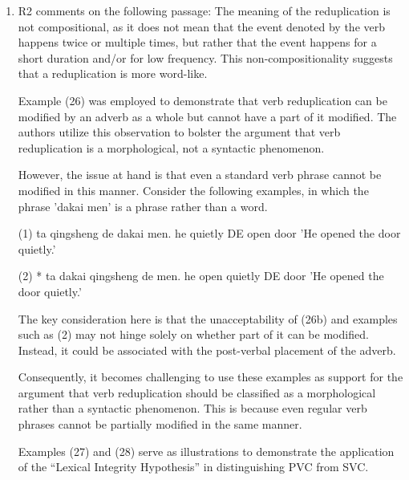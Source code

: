 \documentclass[fleqn,twoside]{article}
\begin{document}
\begin{enumerate}

\item
R2 comments on the following passage: The meaning of the reduplication is not compositional, as it does
not mean that the event denoted by the verb happens twice or multiple times, but
rather that the event happens for a short duration and/or for low frequency. This
non-compositionality suggests that a reduplication is more word-like.



Example (26) was employed to demonstrate that verb reduplication can be modified by an adverb as a whole but cannot have a part of it modified. The authors utilize this observation to bolster the argument that verb reduplication is a morphological, not a syntactic phenomenon.

However, the issue at hand is that even a standard verb phrase cannot be modified in this manner. Consider the following examples, in which the phrase 'dakai men' is a phrase rather than a word.

(1) ta qingsheng de dakai men.
       he  quietly    DE open door
      'He opened the door quietly.'

(2) * ta dakai qingsheng de men.
         he open quietly       DE door
         'He opened the door quietly.'

The key consideration here is that the unacceptability of (26b) and examples such as (2) may not hinge solely on whether part of it can be modified. Instead, it could be associated with the post-verbal placement of the adverb.

Consequently, it becomes challenging to use these examples as support for the argument that verb reduplication should be classified as a morphological rather than a syntactic phenomenon. This is because even regular verb phrases cannot be partially modified in the same manner.


Examples (27) and (28) serve as illustrations to demonstrate the application of the ``Lexical Integrity Hypothesis'' in distinguishing PVC from SVC.


\end{enumerate}
\end{document}
